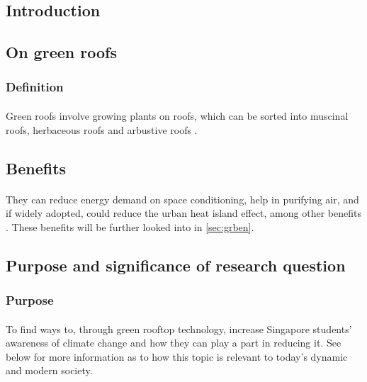 \documentclass{article}
\begin{document}
\newpage

\tableofcontents

\newpage

\begin{multicols}{2}

  \section{Introduction}
  \subsection{On green roofs}
  \subsubsection{Definition}
  \paragraph{} Green roofs involve growing plants on roofs, which can
  be sorted into muscinal roofs, herbaceous roofs and arbustive roofs
  \parencite{ecoeng}.


  \subsection{Benefits}
  \paragraph{} They can reduce energy demand on space conditioning,
  help in purifying air, and if widely adopted, could reduce the urban
  heat island effect, among other benefits \parencite{energeff}. These
  benefits will be further looked into in \cref{sec:grben}.


  \subsection{Purpose and significance of research question}
  \subsubsection{Purpose}
  \paragraph{} To find ways to, through green rooftop technology, increase
  Singapore students' awareness of climate change and how they can play
  a part in reducing it. See below for more information as to how this
  topic is relevant to today's dynamic and modern society.


\end{multicols}
\end{document}
